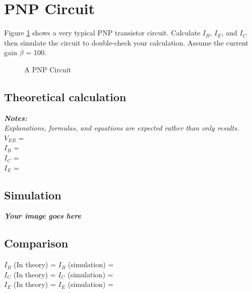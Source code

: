 \section{PNP Circuit}
Figure \ref{lab3_ex6_de} shows a very typical PNP transistor circuit.
Calculate $I_B$, $I_E$, and $I_C$ then simulate the circuit to double-check your calculation. Assume the current gain $\beta$ = 100.

\begin{figure}[H]
    \centering
    \caption{A PNP Circuit}
    \label{lab3_ex6_de}
\end{figure}

\subsection{Theoretical calculation}
\textit{\textbf{Notes:}}\\
\textit{Explanations, formulas, and equations are expected rather than only results.}
\bigskip\\

$V_{EB}$ = \dotfill\bigskip\\
$I_B$ = \dotfill\bigskip\\
$I_C$ = \dotfill\bigskip\\
$I_E$ = \dotfill\bigskip\\

\subsection{Simulation}
\textbf{\textit{Your image goes here}}
\vspace{8cm}

\subsection{Comparison}
$I_B$ (In theory) = \dotfill $I_B$ (simulation) = \dotfill\bigskip\\
$I_C$ (In theory) = \dotfill $I_C$ (simulation) = \dotfill\bigskip\\
$I_E$ (In theory) = \dotfill $I_E$ (simulation) = \dotfill\bigskip\\
